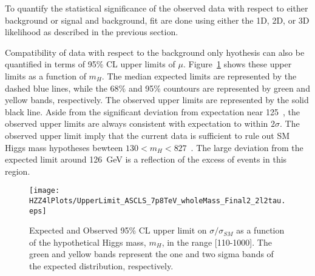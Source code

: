 
To quantify the statistical significance of the observed data
with respect to either background or signal and background, 
fit are done using either the 1D, 2D, or 3D likelihood as 
described in the previous section.  

Compatibility of data with respect to the background only
hyothesis can also be quantified in terms of 95\% CL upper
limits of $\mu$.  
Figure~\ref{fig:HZZ4lUpperLimits} shows these upper limits as
a function of $m_H$.  The median expected limits are represented
by the dashed blue lines, while the 68\% and 95\% countours are 
represented by green and yellow bands, respectively.  The 
observed upper limits are represented by the solid black line. 
Aside from the significant deviation
from expectation near 125~\GeV, the observed upper limits are 
always consistent with expectation to within $2\sigma$.  The
observed upper limit imply that the current data is sufficient
to rule out SM Higgs mass hypotheses bewteen $130<m_{H}<827$~\GeV.
The large deviation from the expected limit around 126~GeV is 
a reflection of the excess of events in this region.  

\begin{figure}
\begin{center}
\texttt{[image: HZZ4lPlots/UpperLimit\_ASCLS\_7p8TeV\_wholeMass\_Final2\_2l2tau.eps]}
\caption{Expected and Observed 95\% CL upper limit on
$\sigma/\sigma_{SM}$ as a function of the hypothetical 
Higgs mass, $m_H$, in the range [110-1000].
The green and yellow bands represent
the one and two sigma bands of the expected distribution, 
respectively.}
\label{fig:HZZ4lUpperLimits}
\end{center}
\end{figure}

